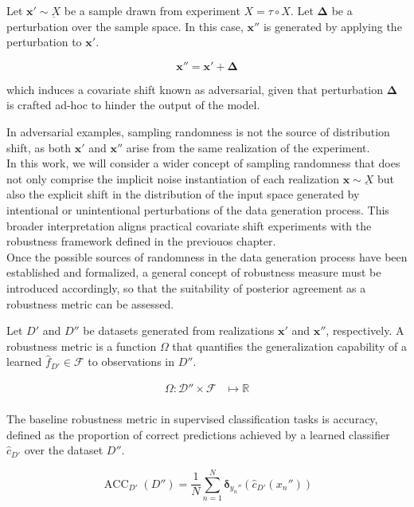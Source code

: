 \begin{definition}
    Let $\bm{x}' \sim \underbar{X}$ be a sample drawn from experiment
    $X = \tau \circ X$. Let $\bm{\Delta}$ be a perturbation over
    the sample space. In this case, $\bm{x}''$ is generated by applying
    the perturbation to $\bm{x}'$.

    $$
    \bm{x}'' = \bm{x}' + \bm{\Delta}
    $$

    which induces a covariate shift known as adversarial, given that
    perturbation $\bm{\Delta}$ is crafted ad-hoc to hinder the 
    output of the model.
\end{definition}

In adversarial examples, sampling randomness is not the source of
distribution shift, as both $\bm{x}'$ and $\bm{x}''$ arise from
the same realization of the experiment. \\

In this work, we will consider a wider concept of sampling 
randomness that does not only comprise the implicit
noise instantiation of each realization $\bm{x} \sim \underbar{X}$
but also the explicit shift in the distribution of the input space
generated by intentional or unintentional perturbations of the 
data generation process. This broader interpretation aligns practical
covariate shift experiments with the robustness framework
defined in the previouos chapter.\\

Once the possible sources of randomness in the data 
generation process have been established and formalized, 
a general concept of robustness measure must be introduced 
accordingly, so that the suitability of posterior agreement
as a robustness metric can be assessed.

\begin{definition}
    Let $D'$ and $D''$ be datasets generated from realizations $\bm{x}'$ and $\bm{x}''$,
    respectively. 
    A robustness metric is a function $\Omega$ that quantifies the generalization
    capability of a learned $\hat{f}_{D'} \in \mathcal{F}$ to observations in $D''$.

    $$
    \begin{aligned}
    \Omega: \mathcal{D}'' \times \mathcal{F} & \longmapsto \mathbb{R} \\
    \end{aligned}
    $$

    The baseline robustness metric in supervised classification tasks is
    accuracy, defined as the proportion of correct predictions 
    achieved by a learned classifier $\hat{c}_{D'}$ over 
    the dataset $D''$.

    $$
    \operatorname{ACC}_{D'}(D'') = \frac{1}{N} \sum_{n=1}^N \bm{\delta}_{y_n''} \left ( \hat{c}_{D'}(x_n'') \right )
    $$

\end{definition}

